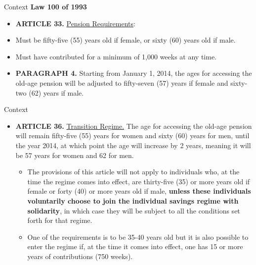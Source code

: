 \documentclass[11pt, aspectratio=169]{beamer}
\newenvironment{wideitemize}{\itemize\addtolength{\itemsep}{10pt}}{\enditemize}
\begin{document}
\begin{frame}{Context}
    \textbf{Law 100 of 1993}
    \vspace{0.2cm}
    \begin{itemize}
        \item \textbf{ARTICLE 33.} \underline{Pension Requirements}:
        \begin{wideitemize}
            \item Must be fifty-five (55) years old if female, or sixty (60) years old if male.
            \item Must have contributed for a minimum of 1,000 weeks at any time.
            \item \textbf{PARAGRAPH 4.} Starting from January 1, 2014, the ages for accessing the old-age pension will be adjusted to fifty-seven (57) years if female and sixty-two (62) years if male.
        \end{wideitemize}
    \end{itemize}

\end{frame}

\begin{frame}{Context}
    \begin{itemize}
        \item \textbf{ARTICLE 36.} \underline{Transition Regime.} The age for accessing the old-age pension will remain fifty-five (55) years for women and sixty (60) years for men, until the year 2014, at which point the age will increase by 2 years, meaning it will be 57 years for women and 62 for men.
        \begin{itemize}
            \item The provisions of this article will not apply to individuals who, at the time the regime comes into effect, are thirty-five (35) or more years old if female or forty (40) or more years old if male, \textbf{unless these individuals voluntarily choose to join the individual savings regime with solidarity}, in which case they will be subject to all the conditions set forth for that regime.
            \item One of the requirements is to be 35-40 years old but it is also possible to enter the regime if, at the time it comes into effect, one has 15 or more years of contributions (750 weeks).
        \end{itemize}
    \end{itemize}
\end{frame}
\end{document}

